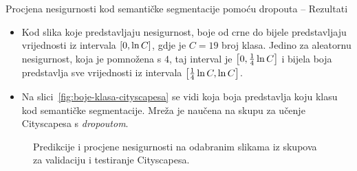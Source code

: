 \documentclass{beamer}
\begin{document}
\begin{frame}[allowframebreaks=0.9]{Procjena nesigurnosti kod semantičke segmentacije pomoću dropouta -- Rezultati}
\begin{itemize}
\begin{enumerate}
	\end{enumerate}
	\item Kod slika koje predstavljaju nesigurnost, boje od crne do bijele predstavljaju vrijednosti iz intervala $\intcc{0,\ln C}$, gdje je $C=19$ broj klasa. Jedino za aleatornu nesigurnost, koja je pomnožena s $4$, taj interval je $\intcc{0,\frac{1}{4}\ln C}$ i bijela boja predstavlja sve vrijednosti iz intervala $\intcc{\frac{1}{4}\ln C,\ln C}$. 
	\item Na slici~\ref{fig:boje-klasa-cityscapesa} se vidi koja boja predstavlja koju klasu kod semantičke segmentacije. Mreža je naučena na skupu za učenje Cityscapesa s \textit{dropoutom}.
\end{itemize}
	\begin{figure}
		\centering
		\caption{Predikcije i procjene nesigurnosti na odabranim slikama iz skupova za validaciju i testiranje Cityscapesa.}
		\label{fig:nesigurnost-predikcije-cityscapes}
	\end{figure}
	

\end{frame}
\end{document}
